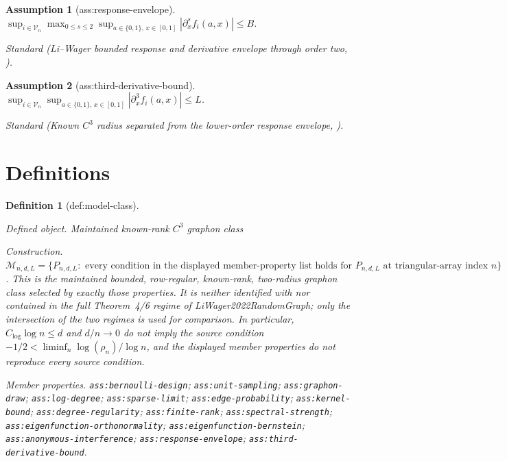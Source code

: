 \documentclass{article}
\newtheorem{assumption}{Assumption}
\newtheorem{definition}{Definition}
\begin{document}
\begin{assumption}[ass:response-envelope]\label{ass:response-envelope}
\(\sup_{i\in\mathcal V_n}\max_{0\le s\le2}\sup_{a\in\{0,1\},\,x\in[0,1]}|\partial_x^s f_i(a,x)|\le B\).
\par\smallskip\noindent\emph{Standard} (Li--Wager bounded response and derivative envelope through order two, \cite{LiWager2022RandomGraph}).
\end{assumption}

\begin{assumption}[ass:third-derivative-bound]\label{ass:third-derivative-bound}
\(\sup_{i\in\mathcal V_n}\sup_{a\in\{0,1\},\,x\in[0,1]}|\partial_x^3 f_i(a,x)|\le L\).
\par\smallskip\noindent\emph{Standard} (Known \(C^3\) radius separated from the lower-order response envelope, \cite{ArmstrongKolesar2020SimpleHonest}).
\end{assumption}

\section{Definitions}

\begin{definition}[def:model-class]\label{def:model-class}
\par\smallskip\noindent\emph{Defined object.} Maintained known-rank \(C^3\) graphon class
\par\smallskip\noindent\emph{Construction.} \(\mathcal M_{n,d,L}=\{P_{n,d,L}:\text{ every condition in the displayed member-property list holds for }P_{n,d,L}\text{ at triangular-array index }n\}\).  This is the maintained bounded, row-regular, known-rank, two-radius graphon class selected by exactly those properties.  It is neither identified with nor contained in the full Theorem~4/6 regime of LiWager2022RandomGraph; only the intersection of the two regimes is used for comparison.  In particular, \(C_{\log}\log n\leq d\) and \(d/n\to0\) do not imply the source condition \(-1/2<\liminf_n\log(\rho_n)/\log n\), and the displayed member properties do not reproduce every source condition.
\par\smallskip\noindent\emph{Member properties.} \texttt{ass:\allowbreak{}bernoulli-\allowbreak{}design}; \texttt{ass:\allowbreak{}unit-\allowbreak{}sampling}; \texttt{ass:\allowbreak{}graphon-\allowbreak{}draw}; \texttt{ass:\allowbreak{}log-\allowbreak{}degree}; \texttt{ass:\allowbreak{}sparse-\allowbreak{}limit}; \texttt{ass:\allowbreak{}edge-\allowbreak{}probability}; \texttt{ass:\allowbreak{}kernel-\allowbreak{}bound}; \texttt{ass:\allowbreak{}degree-\allowbreak{}regularity}; \texttt{ass:\allowbreak{}finite-\allowbreak{}rank}; \texttt{ass:\allowbreak{}spectral-\allowbreak{}strength}; \texttt{ass:\allowbreak{}eigenfunction-\allowbreak{}orthonormality}; \texttt{ass:\allowbreak{}eigenfunction-\allowbreak{}bernstein}; \texttt{ass:\allowbreak{}anonymous-\allowbreak{}interference}; \texttt{ass:\allowbreak{}response-\allowbreak{}envelope}; \texttt{ass:\allowbreak{}third-\allowbreak{}derivative-\allowbreak{}bound}.
\end{definition}
\end{document}
